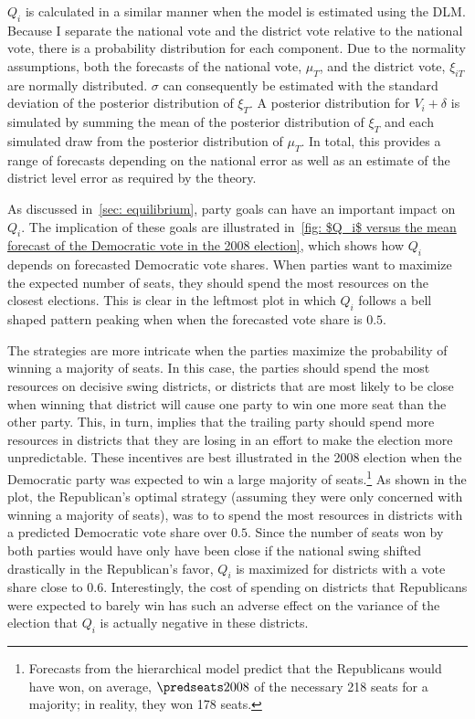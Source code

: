 \documentclass[12pt,final,fleqn]{article}
\theoremstyle{plain}
\begin{document}
$Q_i$ is calculated in a similar manner when the model is estimated using the DLM. Because I separate the national vote and the district vote relative to the national vote, there is a probability distribution for each component. Due to the normality assumptions, both the forecasts of the national vote, $\mu_T$, and the district vote, $\xi_{iT}$ are normally distributed. $\sigma$ can consequently be estimated with the standard deviation of the posterior distribution of $\xi_T$. A posterior distribution for $V_i + \delta$ is simulated by summing the mean of the posterior distribution of $\xi_T$ and each simulated draw from the posterior distribution of $\mu_T$. In total, this provides a range of forecasts depending on the national error as well as an estimate of the district level error as required by the theory.

As discussed in~\autoref{sec: equilibrium}, party goals can have an important impact on $Q_i$. The implication of these goals are illustrated in~\autoref{fig: $Q_i$ versus the mean forecast of the Democratic vote in the 2008 election}, which shows how $Q_i$ depends on forecasted Democratic vote shares. When parties want to maximize the expected number of seats, they should spend the most resources on the closest elections. This is clear in the leftmost plot in which $Q_i$ follows a bell shaped pattern peaking when when the forecasted vote share is $0.5$. 

The strategies are more intricate when the parties maximize the probability of winning a majority of seats. In this case, the parties should spend the most resources on decisive swing districts, or districts that are most likely to be close when winning that district will cause one party to win one more seat than the other party. This, in turn, implies that the trailing party should spend more resources in districts that they are losing in an effort to make the election more unpredictable. These incentives are best illustrated in the 2008 election when the Democratic party was expected to win a large majority of seats.\footnote{Forecasts from the hierarchical model predict that the Republicans would have won, on average, $\predseats2008$ of the necessary 218 seats for a majority; in reality, they won 178 seats.} As shown in the plot, the Republican's optimal strategy (assuming they were only concerned with winning a majority of seats), was to to spend the most resources in districts with a predicted Democratic vote share over $0.5$. Since the number of seats won by both parties would have only have been close if the national swing shifted drastically in the Republican's favor, $Q_i$ is maximized for districts with a vote share close to $0.6$. Interestingly, the cost of spending on districts that Republicans were expected to barely win has such an adverse effect on the variance of the election that $Q_i$ is actually negative in these districts.
 
\end{document}

